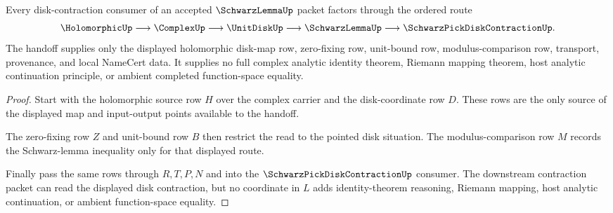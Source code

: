 \begin{theorem}
\label{thm:schwarz-lemma-disk-contraction-handoff}
Every disk-contraction consumer of an accepted $\SchwarzLemmaUp$ packet factors through the ordered route
$$
\HolomorphicUp \longrightarrow \ComplexUp \longrightarrow \UnitDiskUp \longrightarrow \SchwarzLemmaUp \longrightarrow \SchwarzPickDiskContractionUp.
$$
The handoff supplies only the displayed holomorphic disk-map row, zero-fixing row, unit-bound row, modulus-comparison row, transport, provenance, and local NameCert data. It supplies no full complex analytic identity theorem, Riemann mapping theorem, host analytic continuation principle, or ambient completed function-space equality.
\end{theorem}
\begin{proof}
Start with the holomorphic source row $H$ over the complex carrier and the disk-coordinate row $D$. These rows are the only source of the displayed map and input-output points available to the handoff.

The zero-fixing row $Z$ and unit-bound row $B$ then restrict the read to the pointed disk situation. The modulus-comparison row $M$ records the Schwarz-lemma inequality only for that displayed route.

Finally pass the same rows through $R,T,P,N$ and into the $\SchwarzPickDiskContractionUp$ consumer. The downstream contraction packet can read the displayed disk contraction, but no coordinate in $L$ adds identity-theorem reasoning, Riemann mapping, host analytic continuation, or ambient function-space equality.
\end{proof}




